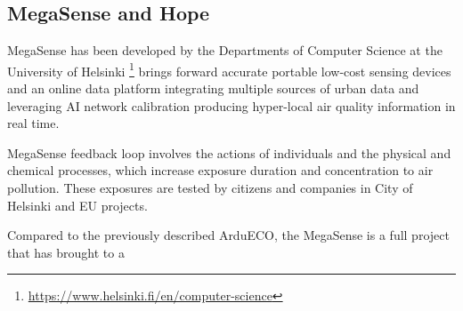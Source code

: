 	\subsection{MegaSense and Hope}


	
		MegaSense has been developed by the Departments of Computer Science at the University of Helsinki \footnote{\url{https://www.helsinki.fi/en/computer-science}} brings forward accurate portable low-cost sensing devices and an online data platform integrating multiple sources of urban data and leveraging AI network calibration producing hyper-local air quality information in real time.
		
		MegaSense feedback loop involves the actions of individuals and the physical and chemical processes, which increase exposure duration and concentration to air pollution. These exposures are tested by citizens and companies in City of Helsinki and EU projects.
		
		Compared to the previously described ArduECO, the MegaSense is a full project that has brought to a 
		
